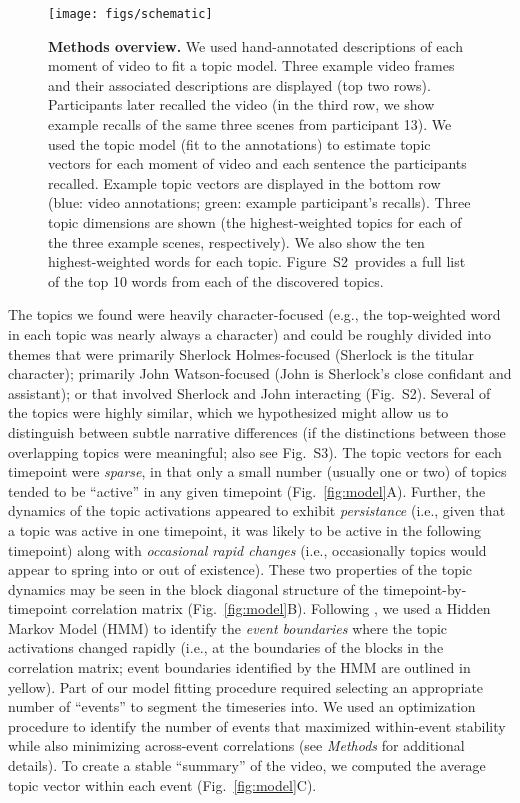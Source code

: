 \documentclass{article}
\newcommand{\topics}{S2}
\newcommand{\featureimportance}{S3}
\begin{document}
\begin{figure}[tp]
\centering
\texttt{[image: figs/schematic]}
\caption{\small \textbf{Methods overview.} We used hand-annotated descriptions of each moment of video to fit a topic model.  Three example video frames and their associated descriptions are displayed (top two rows).  Participants later recalled the video (in the third row, we show example recalls of the same three scenes from participant 13).  We used the topic model (fit to the annotations) to estimate topic vectors for each moment of video and each sentence the participants recalled.  Example topic vectors are displayed in the bottom row (blue: video annotations; green: example participant's recalls).  Three topic dimensions are shown (the highest-weighted topics for each of the three example scenes, respectively).  We also show the ten highest-weighted words for each topic.  Figure~\topics~provides a full list of the top 10 words from each of the discovered topics.}
\label{fig:schematic}
\end{figure}

The topics we found were heavily character-focused (e.g., the top-weighted word in each topic was nearly always a character) and could be roughly divided into themes that were primarily Sherlock Holmes-focused (Sherlock is the titular character); primarily John Watson-focused (John is Sherlock's close confidant and assistant); or that involved Sherlock and John interacting (Fig.~\topics).  Several of the topics were highly similar, which we hypothesized might allow us to distinguish between subtle narrative differences (if the distinctions between those overlapping topics were meaningful; also see Fig.~\featureimportance).  The topic vectors for each timepoint were \textit{sparse}, in that only a small number (usually one or two) of topics tended to be ``active'' in any given timepoint (Fig.~\ref{fig:model}A).  Further, the dynamics of the topic activations appeared to exhibit \textit{persistance} (i.e., given that a topic was active in one timepoint, it was likely to be active in the following timepoint) along with \textit{occasional rapid changes} (i.e., occasionally topics would appear to spring into or out of existence).  These two properties of the topic dynamics may be seen in the block diagonal structure of the timepoint-by-timepoint correlation matrix (Fig.~\ref{fig:model}B).  Following \cite{BaldEtal17}, we used a Hidden Markov Model (HMM) to identify the \textit{event boundaries} where the topic activations changed rapidly (i.e., at the boundaries of the blocks in the correlation matrix; event boundaries identified by the HMM are outlined in yellow).  Part of our model fitting procedure required selecting an appropriate number of ``events'' to segment the timeseries into.  We used an optimization procedure to identify the number of events that maximized within-event stability while also minimizing across-event correlations (see \textit{Methods} for additional details).  To create a stable ``summary'' of the video, we computed the average topic vector within each event (Fig.~\ref{fig:model}C).
\end{document}
